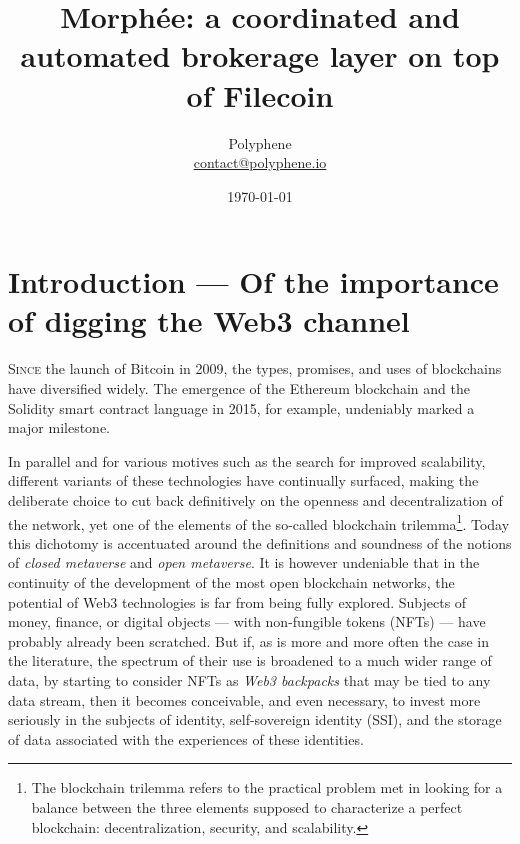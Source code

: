 \documentclass[twoside,twocolumn]{article}
\title{Morphée: a coordinated and automated brokerage layer on top of Filecoin} %
\author{%
\textsc{}
\normalsize Polyphene \\ %
\normalsize \href{mailto:contact@polyphene.io}{contact@polyphene.io} %
}
\date{\today} %
\begin{document}
\maketitle


\section{Introduction — Of the importance of digging the Web3 channel}

\lettrine[nindent=0em,lines=3]{S}{ince} the launch of Bitcoin in 2009, the types, promises, and uses of blockchains have diversified widely.
The emergence of the Ethereum blockchain and the Solidity smart contract language in 2015, for example, undeniably marked a major milestone.

In parallel and for various motives such as the search for improved scalability,
different variants of these technologies have continually surfaced, making the deliberate choice
to cut back definitively on the openness and decentralization of the network, yet one of the elements of the so-called blockchain trilemma\footnote{The
blockchain trilemma refers to the practical problem met in looking for a balance between the three elements
supposed to characterize a perfect blockchain: decentralization, security, and scalability.}.
Today this dichotomy is accentuated around the definitions and soundness of the notions of \emph{closed metaverse} and \emph{open metaverse}.
It is however undeniable that in the continuity of the development of the most open blockchain networks,
the potential of Web3 technologies is far from being fully explored.
Subjects of money, finance, or digital objects — with non-fungible tokens (NFTs) — have probably already been scratched.
But if, as is more and more often the case in the literature, the spectrum of their use is broadened to a much wider range of data,
by starting to consider NFTs as \emph{Web3 backpacks} that may be tied to any data stream,
then it becomes conceivable, and even necessary, to invest more seriously in the subjects of identity,
self-sovereign identity (SSI), and the storage of data associated with the experiences of these identities.
\end{document}
